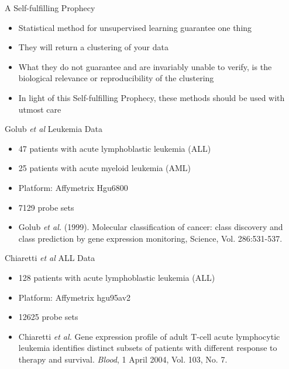 \documentclass[xcolor=x11names,compress]{beamer}\usepackage[]{graphicx}\usepackage[]{color}
\begin{document}
\begin{frame}{A Self-fulfilling Prophecy}
  \begin{itemize}
  \item Statistical method for unsupervised learning guarantee one thing
  \item They will return a clustering of your data
  \item What they do not guarantee and are invariably unable to 
        verify, is the biological relevance or reproducibility of the clustering
  \item In light of this Self-fulfilling Prophecy, these methods should be used
      with utmost care
  \end{itemize}
\end{frame}


\begin{frame}{Golub {\it et al} Leukemia Data}
  \begin{itemize}
  \item 47 patients with acute lymphoblastic leukemia (ALL) 
  \item 25 patients with acute myeloid leukemia (AML)
  \item Platform: Affymetrix Hgu6800
  \item 7129 probe sets
  \item Golub {\it et al.} (1999). Molecular classification of cancer: class discovery and class prediction by gene expression monitoring, Science, Vol. 286:531-537.
  \end{itemize}
\end{frame}

\begin{frame}{ Chiaretti {\it et al} ALL Data}
  \begin{itemize}
  \item 128 patients with acute lymphoblastic leukemia (ALL) 
  \item Platform: Affymetrix hgu95av2
  \item 12625 probe sets
  \item  Chiaretti {\it et al.} 
     Gene
     expression profile of adult T-cell acute lymphocytic leukemia
     identifies distinct subsets of patients with different response to
     therapy and survival. {\it Blood}, 1 April 2004, Vol. 103, No. 7.
  \end{itemize}
\end{frame}
\end{document}
